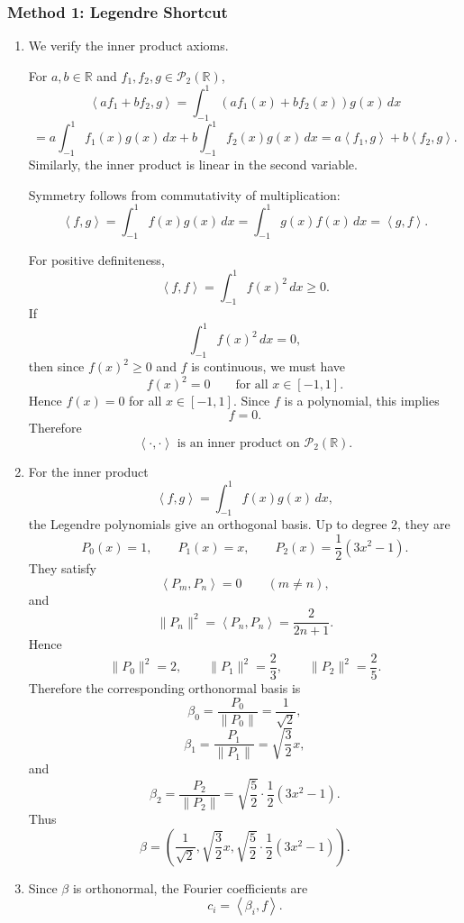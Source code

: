 \documentclass[12pt]{article}
\newcommand{\R}{\mathbb{R}}
\newcommand{\cP}{\mathcal{P}}
\newcommand{\ip}[2]{\left\langle #1,#2\right\rangle}
\begin{document}
\subsubsection{Method 1: Legendre Shortcut}

\begin{enumerate}[label=(\alph*)]
  \item We verify the inner product axioms.

  For $a,b\in\R$ and $f_1,f_2,g\in\cP_2(\R)$,
  \[
    \ip{af_1+bf_2}{g}
    =
    \int_{-1}^{1}(af_1(x)+bf_2(x))g(x)\,dx
  \]
  \[
    =
    a\int_{-1}^{1}f_1(x)g(x)\,dx
    +
    b\int_{-1}^{1}f_2(x)g(x)\,dx
    =
    a\ip{f_1}{g}+b\ip{f_2}{g}.
  \]
  Similarly, the inner product is linear in the second variable.

  Symmetry follows from commutativity of multiplication:
  \[
    \ip{f}{g}
    =
    \int_{-1}^{1}f(x)g(x)\,dx
    =
    \int_{-1}^{1}g(x)f(x)\,dx
    =
    \ip{g}{f}.
  \]

  For positive definiteness,
  \[
    \ip{f}{f}
    =
    \int_{-1}^{1}f(x)^2\,dx
    \ge 0.
  \]
  If
  \[
    \int_{-1}^{1}f(x)^2\,dx=0,
  \]
  then since $f(x)^2\ge0$ and $f$ is continuous, we must have
  \[
    f(x)^2=0
    \qquad
    \text{for all }x\in[-1,1].
  \]
  Hence $f(x)=0$ for all $x\in[-1,1]$. Since $f$ is a polynomial, this implies
  \[
    f=0.
  \]
  Therefore
  \[
    \boxed{\ip{\cdot}{\cdot}\text{ is an inner product on }\cP_2(\R).}
  \]

  \item For the inner product
  \[
    \ip{f}{g}=\int_{-1}^{1}f(x)g(x)\,dx,
  \]
  the Legendre polynomials give an orthogonal basis. Up to degree $2$, they are
  \[
    P_0(x)=1,
    \qquad
    P_1(x)=x,
    \qquad
    P_2(x)=\frac12(3x^2-1).
  \]
  They satisfy
  \[
    \ip{P_m}{P_n}=0
    \qquad(m\ne n),
  \]
  and
  \[
    \|P_n\|^2=\ip{P_n}{P_n}=\frac{2}{2n+1}.
  \]
  Hence
  \[
    \|P_0\|^2=2,
    \qquad
    \|P_1\|^2=\frac23,
    \qquad
    \|P_2\|^2=\frac25.
  \]
  Therefore the corresponding orthonormal basis is
  \[
    \beta_0=\frac{P_0}{\|P_0\|}
    =
    \frac1{\sqrt2},
  \]
  \[
    \beta_1=\frac{P_1}{\|P_1\|}
    =
    \sqrt{\frac32}x,
  \]
  and
  \[
    \beta_2=\frac{P_2}{\|P_2\|}
    =
    \sqrt{\frac52}\cdot \frac12(3x^2-1).
  \]
  Thus
  \[
    \boxed{
    \beta=
    \left(
    \frac1{\sqrt2},
    \sqrt{\frac32}x,
    \sqrt{\frac52}\cdot\frac12(3x^2-1)
    \right).}
  \]

  \item Since $\beta$ is orthonormal, the Fourier coefficients are
  \[
    c_i=\ip{\beta_i}{f}.
  \]


\end{enumerate}
\end{document}
